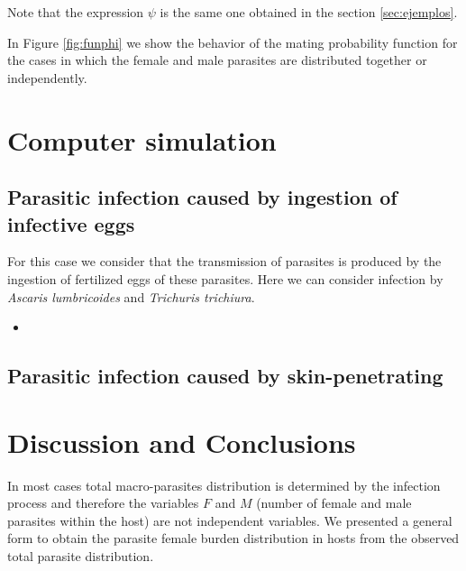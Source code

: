 \documentclass[12pt,a4paper]{article}
\theoremstyle{plain}%
\theoremstyle{definition}
\theoremstyle{remark}
\begin{document}
Note that the expression $\psi$ is the same one obtained in the section \ref{sec:ejemplos}.

	In Figure \ref{fig:funphi} we show the behavior of the mating probability function for the cases in which the female and male parasites are distributed together or independently.


\section{Computer simulation}
\subsection{Parasitic infection caused by ingestion of infective eggs}
For this case we consider that the transmission of parasites is produced by the ingestion of fertilized eggs of these parasites. Here we can consider infection by \textit{Ascaris lumbricoides} and \textit{Trichuris trichiura}.

\begin{itemize}
	\item 
\end{itemize}

\subsection{Parasitic infection caused by skin-penetrating}

	
\section{Discussion and Conclusions}
	
		
In most cases total macro-parasites distribution is determined by the infection process and therefore the variables $F$ and $M$ (number of female and male parasites within the host) are not independent variables. We presented a general form to obtain the parasite female burden distribution in hosts from the observed total parasite distribution. 	
	
\end{document}
